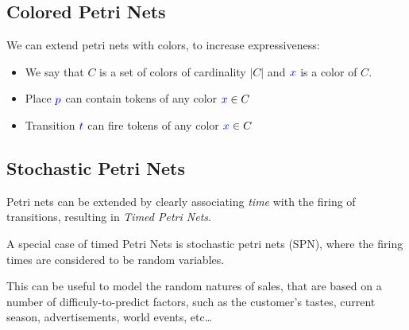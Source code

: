 \documentclass[openright, twoside, twocolumn, a4paper, 10pt]{report}
\begin{document}
\subsection{Colored Petri Nets}

We can extend petri nets with colors, to increase expressiveness:

\begin{itemize}
	\item We say that $C$ is a set of colors of cardinality $|C|$ and $\textcolor{blue}{x}$ is a color of $C$.
	\item Place $\textcolor{blue}{p}$ can contain tokens of any color $\textcolor{blue}{x} \in  C $
	\item Transition $\textcolor{blue}{t}$ can fire tokens of any color $\textcolor{blue}{x} \in C$
\end{itemize}

\subsection{Stochastic Petri Nets}

Petri nets can be extended by clearly associating \emph{time} with the firing of transitions,
resulting in \emph{Timed Petri Nets}.

A special case of timed Petri Nets is stochastic petri nets (SPN), where the firing times are
considered to be random variables.

This can be useful to model the random natures of sales, that are based on a number of
difficuly-to-predict factors, such as the customer's tastes, current season, advertisements,
world events, etc\dots
\end{document}
